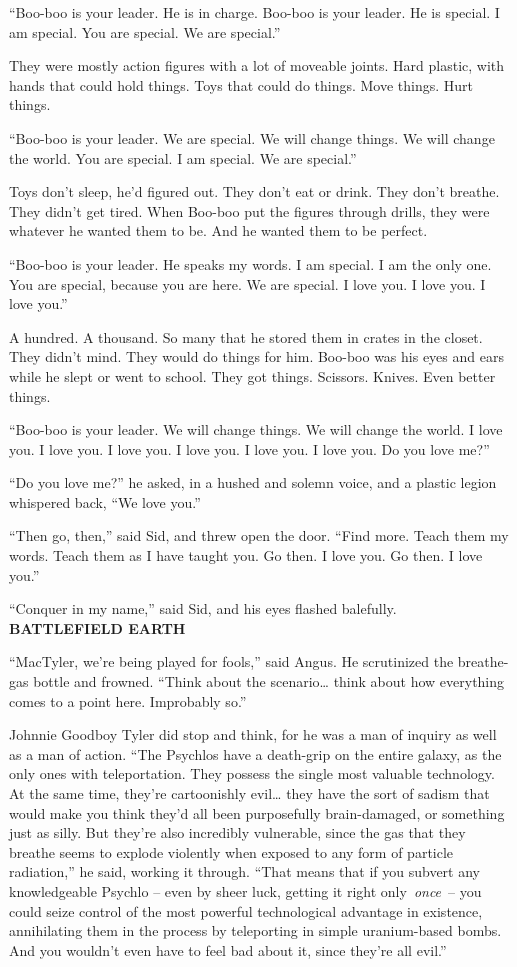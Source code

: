 ``Boo-boo is your leader. He is in charge. Boo-boo is your leader. He is
special. I am special. You are special. We are special.''

They were mostly action figures with a lot of moveable joints. Hard
plastic, with hands that could hold things. Toys that could do things.
Move things. Hurt things.

``Boo-boo is your leader. We are special. We will change things. We will
change the world. You are special. I am special. We are special.''

Toys don't sleep, he'd figured out. They don't eat or drink. They don't
breathe. They didn't get tired. When Boo-boo put the figures through
drills, they were whatever he wanted them to be. And he wanted them to
be perfect.

``Boo-boo is your leader. He speaks my words. I am special. I am the
only one. You are special, because you are here. We are special. I love
you. I love you. I love you.''

A hundred. A thousand. So many that he stored them in crates in the
closet. They didn't mind. They would do things for him. Boo-boo was his
eyes and ears while he slept or went to school. They got things.
Scissors. Knives. Even better things.

``Boo-boo is your leader. We will change things. We will change the
world. I love you. I love you. I love you. I love you. I love you. I
love you. Do you love me?''

``Do you love me?'' he asked, in a hushed and solemn voice, and a
plastic legion whispered back, ``We love you.''

``Then go, then,'' said Sid, and threw open the door. ``Find more. Teach
them my words. Teach them as I have taught you. Go then. I love you. Go
then. I love you.''

``Conquer in my name,'' said Sid, and his eyes flashed balefully.\\

\textbf{BATTLEFIELD EARTH}

``MacTyler, we're being played for fools,'' said Angus. He scrutinized
the breathe-gas bottle and frowned. ``Think about the scenario\ldots{}
think about how everything comes to a point here. Improbably so.''

Johnnie Goodboy Tyler did stop and think, for he was a man of inquiry as
well as a man of action. ``The Psychlos have a death-grip on the entire
galaxy, as the only ones with teleportation. They possess the single
most valuable technology. At the same time, they're cartoonishly
evil\ldots{} they have the sort of sadism that would make you think
they'd all been purposefully brain-damaged, or something just as silly.
But they're also incredibly vulnerable, since the gas that they breathe
seems to explode violently when exposed to any form of particle
radiation,'' he said, working it through. ``That means that if you
subvert any knowledgeable Psychlo -- even by sheer luck, getting it
right only~\emph{once}~-- you could seize control of the most powerful
technological advantage in existence, annihilating them in the process
by teleporting in simple uranium-based bombs. And you wouldn't even have
to feel bad about it, since they're all evil.''

